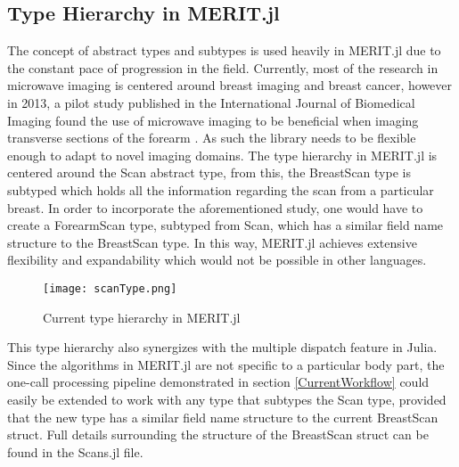 \subsection{Type Hierarchy in MERIT.jl}
The concept of abstract types and subtypes is used heavily in MERIT.jl due to the constant pace of progression in the
field. Currently, most of the research in microwave imaging is centered around breast imaging and breast cancer, however
in 2013, a pilot study published in the International Journal of Biomedical Imaging found the use of microwave imaging
to be beneficial when imaging transverse sections of the forearm \cite{gilmoreMicrowaveImagingHuman2013}. As such the
library needs to be flexible enough to adapt to novel imaging domains. The type hierarchy in MERIT.jl is centered around
the Scan abstract type, from this, the BreastScan type is subtyped which holds all the information regarding the scan
from a particular breast. In order to incorporate the aforementioned study, one would have to create a ForearmScan type,
subtyped from Scan, which has a similar field name structure to the BreastScan type. In this way, MERIT.jl achieves
extensive flexibility and expandability which would not be possible in other languages.
\begin{figure}[h!]
    \texttt{[image: scanType.png]}
    \centering
    \caption{Current type hierarchy in MERIT.jl} 
    \label{fig:scanType}
\end{figure}
\FloatBarrier
This type hierarchy also synergizes with the multiple dispatch feature in Julia. Since the algorithms in MERIT.jl are
not specific to a particular body part, the one-call processing pipeline demonstrated in section \ref{CurrentWorkflow}
could easily be extended to work with any type that subtypes the Scan type, provided that the new type has a similar
field name structure to the current BreastScan struct. Full details surrounding the structure of the BreastScan struct
can be found in the Scans.jl file.


    


